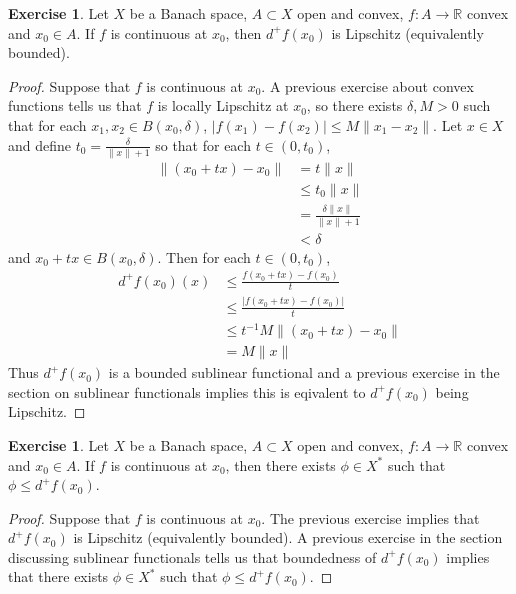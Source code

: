 \documentclass[12pt]{amsart}
\theoremstyle{definition}
\newtheorem{ex}[definition]{Exercise}
\newcommand{\del}{\delta}
\newcommand{\R}{\mathbb{R}}
\newcommand{\lex}[1]{\label{ex:#1}}
\begin{document}
	\begin{ex} \lex{}
	Let $X$ be a Banach space, $A \subset X$ open and convex, $f:A \rightarrow \R$ convex and $x_0 \in A$. If $f$ is continuous at $x_0$, then $d^+f(x_0)$ is Lipschitz (equivalently bounded). 
	\end{ex}	
	
	\begin{proof}
	Suppose that $f$ is continuous at $x_0$. A previous exercise about convex functions tells us that $f$ is locally Lipschitz at $x_0$, so there exists $\del,M >0$ such that for each $x_1, x_2 \in B(x_0, \del)$, $|f(x_1) - f(x_2)| \leq M\|x_1 - x_2\|$. Let $x \in X$ and define $t_0 = \frac{\del}{\|x\| + 1}$ so that for each $t \in (0, t_0)$,
	\begin{align*}
	\|(x_0 +tx) - x_0\|
	& = t\|x\| \\
	& \leq t_0 \| x\| \\
	&= \frac{\del \| x\|}{\|x\| + 1} \\
	& < \del
	\end{align*}  
	and $x_0 +tx \in B(x_0, \del)$.
	Then for each $t \in (0, t_0)$, 
	\begin{align*}
	d^+f(x_0)(x) 
	& \leq \frac{f(x_0 + tx) - f(x_0)}{t} \\
	& \leq \frac{|f(x_0 + tx) - f(x_0)|}{t} \\
	& \leq t^{-1}M \| (x_0 + tx) - x_0\| \\
	&= M\|x\|
	\end{align*}
	Thus $d^+f(x_0)$ is a bounded sublinear functional and  a previous exercise in the section on sublinear functionals implies this is eqivalent to $d^+f(x_0)$ being Lipschitz.
	\end{proof}
	
	\begin{ex} \lex{}
	Let $X$ be a Banach space, $A \subset X$ open and convex, $f:A \rightarrow \R$ convex and $x_0 \in A$. If $f$ is continuous at $x_0$, then there exists $\phi \in X^*$ such that $\phi \leq d^+f(x_0)$.
	\end{ex}	
	
	\begin{proof}
	Suppose that $f$ is continuous at $x_0$. The previous exercise implies that $d^+f(x_0)$ is Lipschitz (equivalently bounded). A previous exercise in the section discussing sublinear functionals tells us that boundedness of $d^+f(x_0)$ implies that there exists $\phi \in X^*$ such that $\phi \leq d^+f(x_0)$.
	\end{proof}
	
\end{document}
